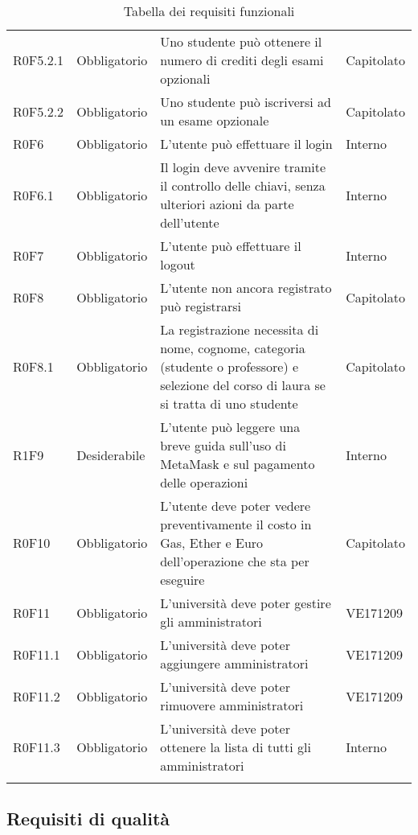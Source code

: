 \documentclass[AnalisiDeiRequisiti.tex]{subfiles}
\begin{document}
\begin{longtable}[H]{p{2.6cm}p{2.5cm}p{5cm}p{2cm}}
	R0F5.2.1 & Obbligatorio & Uno studente può ottenere il numero di crediti degli esami opzionali & Capitolato \\  
	R0F5.2.2 & Obbligatorio & Uno studente può iscriversi ad un esame opzionale & Capitolato \\  
	R0F6 & Obbligatorio & L'utente può effettuare il login & Interno \\  
	R0F6.1 & Obbligatorio & Il login deve avvenire tramite il controllo delle chiavi, senza ulteriori azioni da parte dell'utente & Interno \\  
	R0F7 & Obbligatorio & L'utente può effettuare il logout & Interno \\  
	R0F8 & Obbligatorio & L'utente non ancora registrato può registrarsi & Capitolato \\  
	R0F8.1 & Obbligatorio & La registrazione necessita di nome, cognome, categoria (studente o professore) e selezione del corso di laura se si tratta di uno studente & Capitolato \\  
	R1F9 & Desiderabile & L'utente può leggere una breve guida sull'uso di MetaMask e sul pagamento delle operazioni & Interno \\  	
	R0F10 & Obbligatorio & L'utente deve poter vedere preventivamente il costo in Gas, Ether e Euro dell'operazione che sta per eseguire & Capitolato \\  	
	R0F11 & Obbligatorio & L'università deve poter gestire gli amministratori & VE171209 \\   %
	R0F11.1 & Obbligatorio & L'università deve poter aggiungere amministratori & VE171209 \\   %
	R0F11.2 & Obbligatorio & L'università deve poter rimuovere amministratori & VE171209 \\   %
	R0F11.3 & Obbligatorio & L'università deve poter ottenere la lista di tutti gli amministratori & Interno \\
	\hiderowcolors
	\caption{Tabella dei requisiti funzionali}
\end{longtable}

\subsection{Requisiti di qualità}
\end{document}
